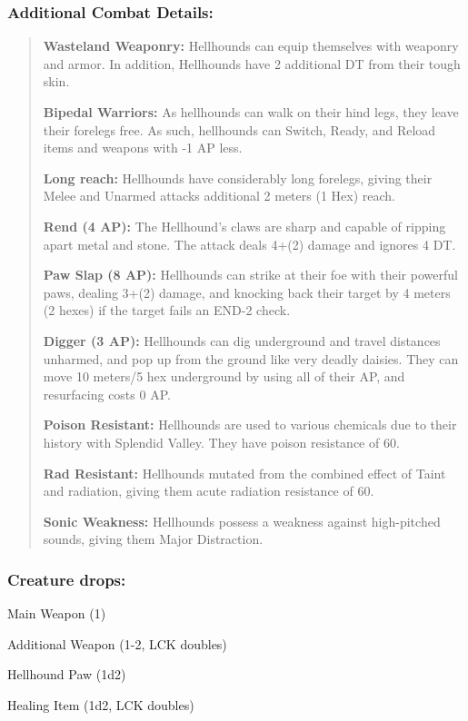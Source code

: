 \documentclass[11pt,a4paper,twocolumn]{book}
\begin{document}
	\subsubsection*{Additional Combat Details:}
	\begin{verse}
		\textbf{Wasteland Weaponry:} Hellhounds can equip themselves with weaponry and armor. In addition, Hellhounds have 2 additional DT from their tough skin.
		
		\textbf{Bipedal Warriors:} As hellhounds can walk on their hind legs, they leave their forelegs free. As such, hellhounds can Switch, Ready, and Reload items and weapons with -1 AP less.
		
		\textbf{Long reach:} Hellhounds have considerably long forelegs, giving their Melee and Unarmed attacks additional 2 meters (1 Hex) reach.
		
		\textbf{Rend (4 AP):} The Hellhound's claws are sharp and capable of ripping apart metal and stone. The attack deals 4+(2) damage and ignores 4 DT.
		
		\textbf{Paw Slap (8 AP):} Hellhounds can strike at their foe with their powerful paws, dealing 3+(2) damage, and knocking back their target by 4 meters (2 hexes) if the target fails an END-2 check.
		
		\textbf{Digger (3 AP):} Hellhounds can dig underground and travel distances unharmed, and pop up from the ground like very deadly daisies. They can move 10 meters/5 hex underground by using all of their AP, and resurfacing costs 0 AP.
		
		\textbf{Poison Resistant:} Hellhounds are used to various chemicals due to their history with Splendid Valley. They have poison resistance of 60.
		
		\textbf{Rad Resistant:} Hellhounds mutated from the combined effect of Taint and radiation, giving them acute radiation resistance of 60.
		
		\textbf{Sonic Weakness:} Hellhounds possess a weakness against high-pitched sounds, giving them Major Distraction.
	\end{verse}
	
	\subsubsection*{Creature drops:}
	\begin{compactitem}
		\item Main Weapon (1)
		\item Additional Weapon (1-2, LCK doubles)
		\item Hellhound Paw (1d2)
		\item Healing Item (1d2, LCK doubles)
	\end{compactitem}
	
\end{document}
